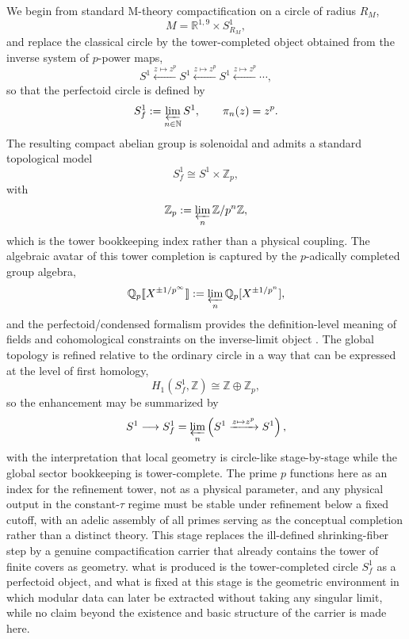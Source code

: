 \documentclass[11pt]{article}
\theoremstyle{remark}
\newcommand{\N}{\mathbb{N}}
\newcommand{\Z}{\mathbb{Z}}
\newcommand{\R}{\mathbb{R}}
\newcommand{\Q}{\mathbb{Q}}
\begin{document}
We begin from standard M-theory compactification on a circle of radius \(R_M\),
\begin{equation}\label{83}
M=\R^{1,9}\times S^{1}_{R_M},
\end{equation}
and replace the classical circle by the tower-completed object obtained from the inverse system of \(p\)-power maps,
\begin{equation}\label{84}
S^{1}\xleftarrow{z\mapsto z^{p}}S^{1}\xleftarrow{z\mapsto z^{p}}S^{1}\xleftarrow{z\mapsto z^{p}}\cdots,
\end{equation}
so that the perfectoid circle is defined by
\begin{equation}\label{85}
S_f^{1}:=\varprojlim_{n\in\N}S^{1},\qquad \pi_n(z)=z^{p}.
\end{equation}
The resulting compact abelian group is solenoidal and admits a standard topological model
\begin{equation}\label{86}
S_f^{1}\cong S^{1}\times \Z_p,
\end{equation}
with
\begin{equation}\label{87}
\Z_p:=\varprojlim_{n}\Z/p^{n}\Z,
\end{equation}
which is the tower bookkeeping index rather than a physical coupling. The algebraic avatar of this tower completion is captured by the \(p\)-adically completed group algebra,
\begin{equation}\label{88}
\Q_p\llbracket X^{\pm 1/p^\infty}\rrbracket:=\varprojlim_{n}\Q_p[X^{\pm 1/p^{n}}],
\end{equation}
and the perfectoid/condensed formalism provides the definition-level meaning of fields and cohomological constraints on the inverse-limit object \cite{Scholze2012, ClausenScholze}. The global topology is refined relative to the ordinary circle in a way that can be expressed at the level of first homology,
\begin{equation}\label{89}
H_1(S_f^{1},\Z)\cong \Z\oplus \Z_p,
\end{equation}
so the enhancement may be summarized by
\begin{equation}\label{90}
S^{1}\longrightarrow S_f^{1}=\varprojlim_{n}\left(S^{1}\xrightarrow{z\mapsto z^{p}}S^{1}\right),
\end{equation}
with the interpretation that local geometry is circle-like stage-by-stage while the global sector bookkeeping is tower-complete. The prime \(p\) functions here as an index for the refinement tower, not as a physical parameter, and any physical output in the constant-\(\tau\) regime must be stable under refinement below a fixed cutoff, with an adelic assembly of all primes serving as the conceptual completion rather than a distinct theory. This stage replaces the ill-defined shrinking-fiber step by a genuine compactification carrier that already contains the tower of finite covers as geometry. what is produced is the tower-completed circle \(S_f^{1}\) as a perfectoid object, and what is fixed at this stage is the geometric environment in which modular data can later be extracted without taking any singular limit, while no claim beyond the existence and basic structure of the carrier is made here.
\end{document}
